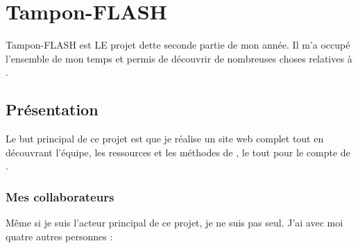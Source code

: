 \chapter{Tampon-FLASH}
Tampon-FLASH est LE projet dette seconde partie de mon année. Il m'a occupé l'ensemble de mon temps et permis de découvrir de nombreuses choses relatives à \fidit.

\section{Présentation}
Le but principal de ce projet est que je réalise un site web complet tout en découvrant l'équipe, les ressources et les méthodes de \fidit, le tout pour le compte de \solulog.

\subsection{Mes collaborateurs}
Même si je suis l'acteur principal de ce projet, je ne suis pas seul. J'ai avec moi quatre autres personnes :
